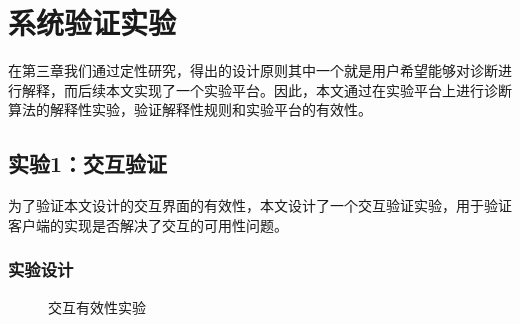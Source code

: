 \chapter{系统验证实验}

在第三章我们通过定性研究，得出的设计原则其中一个就是用户希望能够对诊断进行解释，而后续本文实现了一个实验平台。因此，本文通过在实验平台上进行诊断算法的解释性实验，验证解释性规则和实验平台的有效性。


\section{实验1：交互验证}
为了验证本文设计的交互界面的有效性，本文设计了一个交互验证实验，用于验证客户端的实现是否解决了交互的可用性问题。

\subsection{实验设计}

\begin{figure}[h]
    \centering
    \caption{交互有效性实验}
    \label{fig:interface}
\end{figure}

